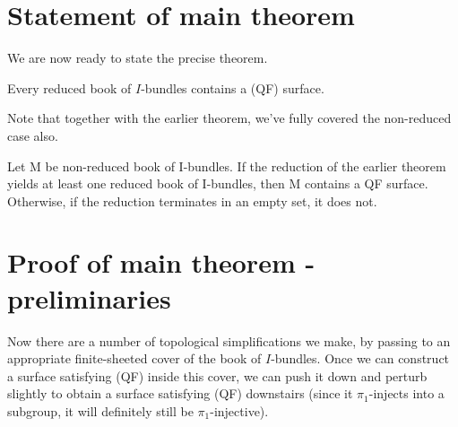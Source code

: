 \section{Statement of main theorem}

We are now ready to state the precise theorem.

\begin{thm}

Every reduced book of $I$-bundles contains a (QF) surface.

\end{thm}

Note that together with the earlier theorem, we've fully covered the
non-reduced case also.

\begin{thm}

Let M be non-reduced book of I-bundles. If the reduction of the earlier theorem
yields at least one reduced book of I-bundles, then M contains a QF surface.
Otherwise, if the reduction terminates in an empty set, it does not.

\end{thm}

\section{Proof of main theorem - preliminaries}

Now there are a number of topological simplifications we make, by passing to an
appropriate finite-sheeted cover of the book of $I$-bundles.  Once we can
construct a surface satisfying (QF) inside this cover, we can push it
down and perturb slightly to obtain a surface satisfying (QF)
downstairs (since it $\pi_1$-injects into a subgroup, it will definitely still
be $\pi_1$-injective).

